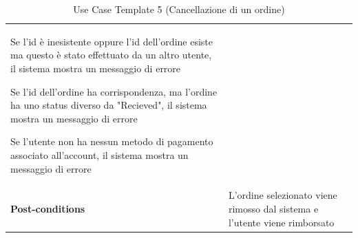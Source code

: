 \documentclass{article}
\begin{document}
\begin{table}
\begin{tabularx}{\textwidth}{|lX|}
\begin{description}[nosep,before=\leavevmode\vspace*{-1\baselineskip},after=\leavevmode\vspace*{-1\baselineskip}]
                                                                        \item [2a.] Se l'id è inesistente oppure l'id dell'ordine esiste ma questo è stato effettuato da un altro utente, il sistema mostra un messaggio di errore
                                                                        \item [2b.] Se l'id dell'ordine ha corrispondenza, ma l'ordine ha uno status diverso da "Recieved", il sistema mostra un messaggio di errore
                                                                        \item [3a.] Se l'utente non ha nessun metodo di pagamento associato all'account, il sistema mostra un messaggio di errore
                                                                    \end{description} \\
                    \rowcolor{white} \textbf{Post-conditions} & L'ordine selezionato viene rimosso dal sistema e l'utente viene rimborsato \\
                    \toprule
                \end{tabularx}
                \caption{Use Case Template 5 (Cancellazione di un ordine)}
                \label{tab:use-case-template-5}
            \end{table}
\end{document}
